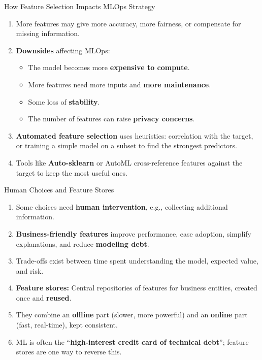 \begin{frame}{How Feature Selection Impacts MLOps Strategy}
\begin{enumerate}
\item<1-> More features may give more accuracy, more fairness, or compensate for missing information.
\item<2-> \textbf{Downsides} affecting MLOps:
    \begin{itemize}
    \item The model becomes more \textbf{expensive to compute}.
    \item More features need more inputs and \textbf{more maintenance}.
    \item Some loss of \textbf{stability}.
    \item The number of features can raise \textbf{privacy concerns}.
    \end{itemize}
\item<3-> \textbf{Automated feature selection} uses heuristics: correlation with the target, or training a simple model on a subset to find the strongest predictors.
\item<4-> Tools like \textbf{Auto-sklearn} or AutoML cross-reference features against the target to keep the most useful ones.
\end{enumerate}
\end{frame}

\begin{frame}{Human Choices and Feature Stores}
\begin{enumerate}
\item<1-> Some choices need \textbf{human intervention}, e.g., collecting additional information.
\item<2-> \textbf{Business-friendly features} improve performance, ease adoption, simplify explanations, and reduce \textbf{modeling debt}.
\item<3-> Trade-offs exist between time spent understanding the model, expected value, and risk.
\item<4-> \textbf{Feature stores:} Central repositories of features for business entities, created once and \textbf{reused}.
\item<5-> They combine an \textbf{offline} part (slower, more powerful) and an \textbf{online} part (fast, real-time), kept consistent.
\item<6-> ML is often the ``\textbf{high-interest credit card of technical debt}''; feature stores are one way to reverse this.
\end{enumerate}
\end{frame}

